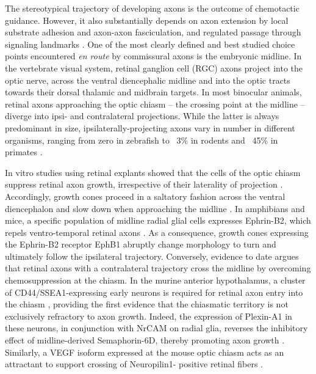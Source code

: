The stereotypical trajectory of developing axons is the outcome of chemotactic guidance.
However, it also substantially depends on axon extension by local substrate adhesion and axon-axon fasciculation, and regulated passage through signaling landmarks \cite{raper2010cellular}.
One of the most clearly defined and best studied choice points encountered \emph{en route} by commissural axons is the embryonic midline.
In the vertebrate visual system, retinal ganglion cell (RGC) axons project into the optic nerve, across the ventral diencephalic midline and into the optic tracts towards their dorsal thalamic and midbrain targets.
In most binocular animals, retinal axons approaching the optic chiasm -- the crossing point at the midline -- diverge into ipsi- and contralateral projections.
While the latter is always predominant in size, ipsilaterally-projecting axons vary in number in different organisms, ranging from zero in zebrafish to ~3\% in rodents and ~45\% in primates \cite{jeffery2005variations}.

In vitro studies using retinal explants showed that the cells of the optic chiasm suppress retinal axon growth, irrespective of their laterality of projection \cite{kuwajima2012optic,wang1995crossed,wang1996chemosuppression,wizenmann1993differential}.
Accordingly, growth cones proceed in a saltatory fashion across the ventral diencephalon and slow down when approaching the midline \cite{harris1987retinal,hutson2002pathfinding,mason1997growth}.
In amphibians and mice, a specific population of midline radial glial cells expresses Ephrin-B2, which repels ventro-temporal retinal
axons \cite{nakagawa2000ephrin,williams2003ephrin}.
As a consequence, growth cones expressing the Ephrin-B2 receptor EphB1 abruptly change morphology to turn and ultimately follow the ipsilateral trajectory.
Conversely, evidence to date argues that retinal axons with a contralateral trajectory cross the midline by overcoming chemosuppression at the chiasm.
In the murine anterior hypothalamus, a cluster of CD44/SSEA1-expressing early neurons is required for retinal axon entry into the chiasm \cite{sretavan1995disruption}, providing the first evidence that the chiasmatic territory is not exclusively refractory to axon growth.
Indeed, the expression of Plexin-A1 in these neurons, in conjunction with NrCAM on radial glia, reverses the inhibitory effect of midline-derived Semaphorin-6D, thereby promoting axon growth \cite{williams2006role,kuwajima2012optic}.
Similarly, a VEGF isoform expressed at the mouse optic chiasm acts as an attractant to support crossing of Neuropilin1- positive retinal fibers \cite{erskine2011vegf}.

